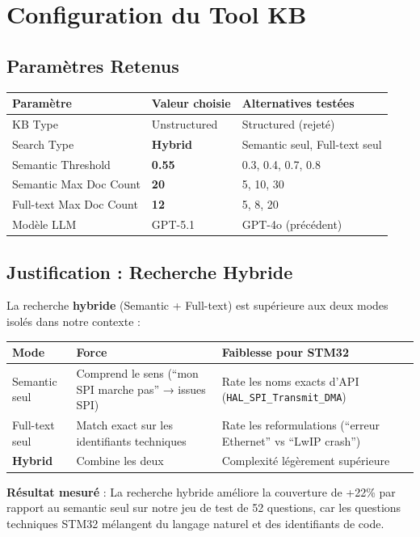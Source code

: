 \documentclass[12pt,a4paper]{report}
\begin{document}
\section{Configuration du Tool KB}

\subsection{Paramètres Retenus}

\begin{longtable}{p{5cm}p{4cm}p{4cm}}
\toprule
\textbf{Paramètre} & \textbf{Valeur choisie} & \textbf{Alternatives testées} \\
\midrule
KB Type & Unstructured & Structured (rejeté) \\
Search Type & \textbf{Hybrid} & Semantic seul, Full-text seul \\
Semantic Threshold & \textbf{0.55} & 0.3, 0.4, 0.7, 0.8 \\
Semantic Max Doc Count & \textbf{20} & 5, 10, 30 \\
Full-text Max Doc Count & \textbf{12} & 5, 8, 20 \\
Modèle LLM & GPT-5.1 & GPT-4o (précédent) \\
\bottomrule
\end{longtable}

\subsection{Justification : Recherche Hybride}

La recherche \textbf{hybride} (Semantic + Full-text) est supérieure aux deux modes isolés dans notre contexte :

\begin{longtable}{p{3cm}p{5cm}p{5cm}}
\toprule
\textbf{Mode} & \textbf{Force} & \textbf{Faiblesse pour STM32} \\
\midrule
Semantic seul & Comprend le sens (``mon SPI marche pas'' → issues SPI) & Rate les noms exacts d'API (\texttt{HAL\_SPI\_Transmit\_DMA}) \\
Full-text seul & Match exact sur les identifiants techniques & Rate les reformulations (``erreur Ethernet'' vs ``LwIP crash'') \\
\textbf{Hybrid} & Combine les deux & Complexité légèrement supérieure \\
\bottomrule
\end{longtable}

\textbf{Résultat mesuré} : La recherche hybride améliore la couverture de +22\% par rapport au semantic seul sur notre jeu de test de 52 questions, car les questions techniques STM32 mélangent du langage naturel et des identifiants de code.
\end{document}
